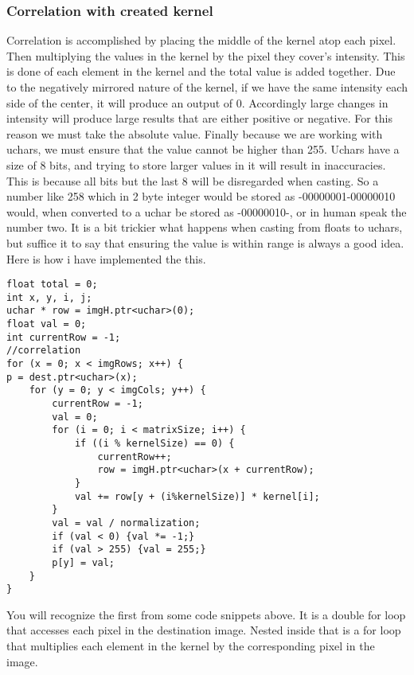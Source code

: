 \documentclass{article}
\begin{document}
\subsubsection{Correlation with created kernel}
Correlation is accomplished by placing the middle of the kernel atop each pixel. Then multiplying the values in the kernel by the pixel they cover's intensity. This is done of each element in the kernel and the total value is added together. Due to the negatively mirrored nature of the kernel, if we have the same intensity each side of the center, it will produce an output of 0. Accordingly large changes in intensity will produce large results that are either positive or negative. For this reason we must take the absolute value. Finally because we are working with uchars, we must ensure that the value cannot be higher than 255. Uchars have a size of 8 bits, and trying to store larger values in it will result in inaccuracies. This is because all bits but the last 8 will be disregarded when casting. So a number like 258 which in 2 byte integer would be stored as -00000001-00000010 would, when converted to a uchar be stored as -00000010-, or in human speak the number two. It is a bit trickier what happens when casting from floats to uchars, but suffice it to say that ensuring the value is within range is always a good idea. Here is how i have implemented the this.
\begin{lstlisting}
float total = 0;
int x, y, i, j;
uchar * row = imgH.ptr<uchar>(0);
float val = 0;
int currentRow = -1;
//correlation
for (x = 0; x < imgRows; x++) {
p = dest.ptr<uchar>(x);
	for (y = 0; y < imgCols; y++) {
		currentRow = -1;
		val = 0;
		for (i = 0; i < matrixSize; i++) {
			if ((i % kernelSize) == 0) {
				currentRow++;
				row = imgH.ptr<uchar>(x + currentRow);
			}
			val += row[y + (i%kernelSize)] * kernel[i];
		}
		val = val / normalization;
		if (val < 0) {val *= -1;}
		if (val > 255) {val = 255;}
		p[y] = val;
	}
}
\end{lstlisting} 
You will recognize the first from some code snippets above. It is a double for loop that accesses each pixel in the destination image. Nested inside that is a for loop that multiplies each element in the kernel by the corresponding pixel in the image.\\
\end{document}

